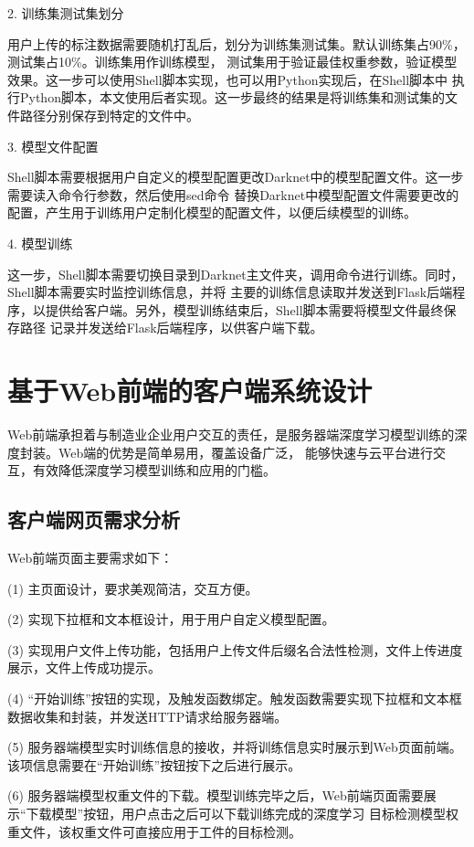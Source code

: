 2. 训练集测试集划分

用户上传的标注数据需要随机打乱后，划分为训练集测试集。默认训练集占90\%，测试集占10\%。训练集用作训练模型，
测试集用于验证最佳权重参数，验证模型效果。这一步可以使用Shell脚本实现，也可以用Python实现后，在Shell脚本中
执行Python脚本，本文使用后者实现。这一步最终的结果是将训练集和测试集的文件路径分别保存到特定的文件中。

3. 模型文件配置

Shell脚本需要根据用户自定义的模型配置更改Darknet中的模型配置文件。这一步需要读入命令行参数，然后使用sed命令
替换Darknet中模型配置文件需要更改的配置，产生用于训练用户定制化模型的配置文件，以便后续模型的训练。

4. 模型训练

这一步，Shell脚本需要切换目录到Darknet主文件夹，调用命令进行训练。同时，Shell脚本需要实时监控训练信息，并将
主要的训练信息读取并发送到Flask后端程序，以提供给客户端。另外，模型训练结束后，Shell脚本需要将模型文件最终保存路径
记录并发送给Flask后端程序，以供客户端下载。

\section{基于Web前端的客户端系统设计}

Web前端承担着与制造业企业用户交互的责任，是服务器端深度学习模型训练的深度封装。Web端的优势是简单易用，覆盖设备广泛，
能够快速与云平台进行交互，有效降低深度学习模型训练和应用的门槛。

\subsection{客户端网页需求分析}

Web前端页面主要需求如下：

(1) 主页面设计，要求美观简洁，交互方便。

(2) 实现下拉框和文本框设计，用于用户自定义模型配置。

(3) 实现用户文件上传功能，包括用户上传文件后缀名合法性检测，文件上传进度展示，文件上传成功提示。

(4) “开始训练”按钮的实现，及触发函数绑定。触发函数需要实现下拉框和文本框数据收集和封装，并发送HTTP请求给服务器端。

(5) 服务器端模型实时训练信息的接收，并将训练信息实时展示到Web页面前端。该项信息需要在“开始训练”按钮按下之后进行展示。

(6) 服务器端模型权重文件的下载。模型训练完毕之后，Web前端页面需要展示“下载模型”按钮，用户点击之后可以下载训练完成的深度学习
目标检测模型权重文件，该权重文件可直接应用于工件的目标检测。

